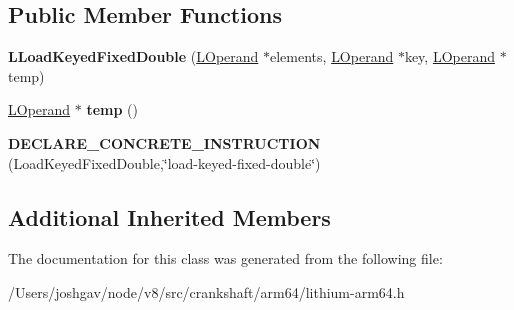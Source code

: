 \subsection*{Public Member Functions}
\begin{DoxyCompactItemize}
\item 
{\bfseries L\+Load\+Keyed\+Fixed\+Double} (\hyperlink{classv8_1_1internal_1_1_l_operand}{L\+Operand} $\ast$elements, \hyperlink{classv8_1_1internal_1_1_l_operand}{L\+Operand} $\ast$key, \hyperlink{classv8_1_1internal_1_1_l_operand}{L\+Operand} $\ast$temp)\hypertarget{classv8_1_1internal_1_1_l_load_keyed_fixed_double_a204325bcacc2264f9540490066230bc7}{}\label{classv8_1_1internal_1_1_l_load_keyed_fixed_double_a204325bcacc2264f9540490066230bc7}

\item 
\hyperlink{classv8_1_1internal_1_1_l_operand}{L\+Operand} $\ast$ {\bfseries temp} ()\hypertarget{classv8_1_1internal_1_1_l_load_keyed_fixed_double_a07dcbae4463f5b49bc964954b4fe6845}{}\label{classv8_1_1internal_1_1_l_load_keyed_fixed_double_a07dcbae4463f5b49bc964954b4fe6845}

\item 
{\bfseries D\+E\+C\+L\+A\+R\+E\+\_\+\+C\+O\+N\+C\+R\+E\+T\+E\+\_\+\+I\+N\+S\+T\+R\+U\+C\+T\+I\+ON} (Load\+Keyed\+Fixed\+Double,\char`\"{}load-\/keyed-\/fixed-\/double\char`\"{})\hypertarget{classv8_1_1internal_1_1_l_load_keyed_fixed_double_aaf9857f21f320cc23c8a6254edaa6116}{}\label{classv8_1_1internal_1_1_l_load_keyed_fixed_double_aaf9857f21f320cc23c8a6254edaa6116}

\end{DoxyCompactItemize}
\subsection*{Additional Inherited Members}


The documentation for this class was generated from the following file\+:\begin{DoxyCompactItemize}
\item 
/\+Users/joshgav/node/v8/src/crankshaft/arm64/lithium-\/arm64.\+h\end{DoxyCompactItemize}

